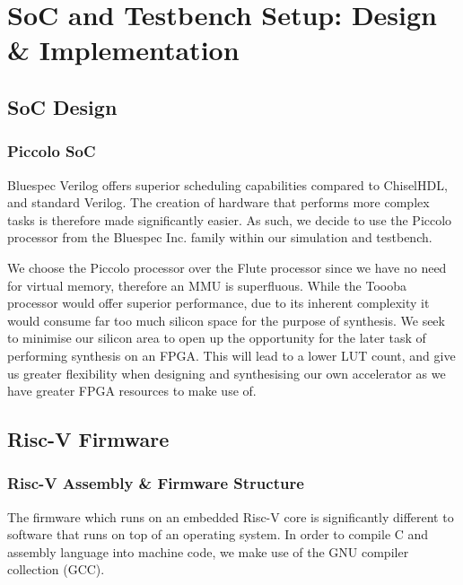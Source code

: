 \documentclass[a4paper,8pt]{report}
\begin{document}
\chapter{SoC and Testbench Setup: Design \& Implementation}

\section{SoC Design}
\subsection{Piccolo SoC}
Bluespec Verilog offers superior scheduling capabilities compared to ChiselHDL,
and standard Verilog. The creation of hardware that performs more complex tasks
is therefore made significantly easier. As such, we decide to use the Piccolo
processor from the Bluespec Inc. family within our simulation and testbench.

We choose the Piccolo processor over the Flute processor since we have no need
for virtual memory, therefore an MMU is superfluous. While the Toooba processor
would offer superior performance, due to its inherent complexity it would
consume far too much silicon space for the purpose of synthesis. We seek to
minimise our silicon area to open up the opportunity for the later task of
performing synthesis on an FPGA. This will lead to a lower LUT count, and give
us greater flexibility when designing and synthesising our own accelerator as we
have greater FPGA resources to make use of.


\section{Risc-V Firmware}
\subsection{Risc-V Assembly \& Firmware Structure}
The firmware which runs on an embedded Risc-V core is significantly different to
software that runs on top of an operating system. In order to compile C and
assembly language into machine code, we make use of the GNU compiler collection
(GCC).
\end{document}
